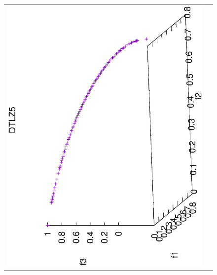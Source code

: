 \begin{figure}[H]
\begin{tabular}{cc}
 \includegraphics[scale=0.3, angle=-90,origin=c]{Figures_Chapter7/Results_Chapter4/Summary_Representative/VSD-MOEA/DTLZ5.eps} &

\end{tabular}
\end{figure}
